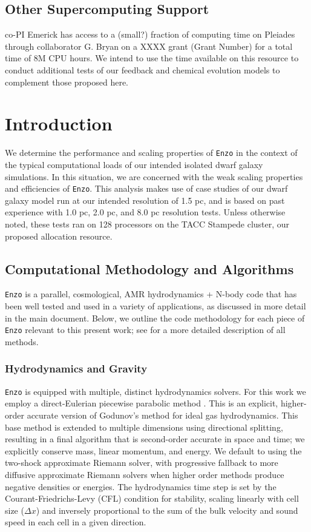 \documentclass[11pt]{article}
\begin{document}
\subsection{Other Supercomputing Support}
 
co-PI Emerick has access to a (small?) fraction of computing time on Pleiades through collaborator G. Bryan on a XXXX grant (Grant Number) for a total time of 8M CPU hours. We intend to use the time available on this resource to conduct additional tests of our feedback and chemical evolution models to complement those proposed here.
\clearpage
\appendix

\section{Introduction}

We determine the performance and scaling properties of \texttt{Enzo} in the context of the typical computational loads of our intended isolated dwarf galaxy simulations. In this situation, we are concerned with the weak scaling properties and efficiencies of \texttt{Enzo}. This analysis makes use of case studies of our dwarf galaxy model run at our intended resolution of 1.5 pc, and is based on past experience with 1.0 pc, 2.0 pc, and 8.0 pc resolution tests. Unless otherwise noted, these tests ran on 128 processors on the TACC Stampede cluster, our proposed allocation resource.

\subsection{Computational Methodology and Algorithms}

\texttt{Enzo} is a parallel, cosmological, AMR hydrodynamics + N-body code that has been well tested and used in a variety of applications, as discussed in more detail in the main document. Below, we outline the code methodology for each piece of \texttt{Enzo} relevant to this present work; see \cite{Enzo2014} for a more detailed description of all methods. 

\subsubsection{Hydrodynamics and Gravity}

\texttt{Enzo} is equipped with multiple, distinct hydrodynamics solvers. For this work we employ a direct-Eulerian piecewise parabolic method \citep{ColellaWoodward1984, Bryan1995}. This is an explicit, higher-order accurate version of Godunov's method for ideal gas hydrodynamics. This base method is extended to multiple dimensions using directional splitting, resulting in a final algorithm that is second-order accurate in space and time; we explicitly conserve mass, linear momentum, and energy. We default to using the two-shock approximate Riemann solver, with progressive fallback to more diffusive approximate Riemann solvers when higher order methods produce negative densities or energies. The hydrodynamics time step is set by the Courant-Friedrichs-Levy (CFL) condition for stability, scaling linearly with cell size ($\Delta x$) and inversely proportional to the sum of the bulk velocity and sound speed in each cell in a given direction. 
\end{document}

